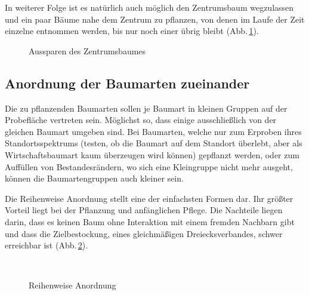 \documentclass[twocolumn]{scrartcl}
\newcommand{\hexA}[3]{%
  \begin{scope}[blend mode=difference]
    \node[hexa,fill=#3] (p) at (#1,#2) {};
    \fill[white] (p) circle (1pt);
  \end{scope}
}
\begin{document}
In weiterer Folge ist es natürlich auch möglich den Zentrumsbaum wegzulassen und
ein paar Bäume nahe dem Zentrum zu pflanzen, von denen im Laufe der Zeit
einzelne entnommen werden, bis nur noch einer übrig bleibt
(Abb.\,\ref{fig:keinZentrumsbaum}).

\begin{figure}[htbp]
  \centering
{}
\caption{Aussparen des Zentrumsbaumes}
\label{fig:keinZentrumsbaum}
\end{figure}

\subsection{Anordnung der Baumarten zueinander}

Die zu pflanzenden Baumarten sollen je Baumart in kleinen Gruppen auf der
Probefläche vertreten sein. Möglichst so, dass einige ausschließlich von der
gleichen Baumart umgeben sind. Bei Baumarten, welche nur zum Erproben ihres
Standortsspektrums (testen, ob die Baumart auf dem Standort überlebt, aber als
Wirtschaftsbaumart kaum überzeugen wird können) gepflanzt werden, oder zum
Auffüllen von Bestandesrändern, wo sich eine Kleingruppe nicht mehr ausgeht,
können die Baumartengruppen auch kleiner sein.

Die Reihenweise Anordnung stellt eine der einfachsten Formen dar. Ihr größter
Vorteil liegt bei der Pflanzung und anfänglichen Pflege. Die Nachteile liegen
darin, dass es keinen Baum ohne Interaktion mit einem fremden Nachbarn gibt und
dass die Zielbestockung, eines gleichmäßigen Dreiecksverbandes, schwer
erreichbar ist (Abb.\,\ref{fig:reihen}).

\begin{figure}[htbp]
  \centering
  \\
  \caption{Reihenweise Anordnung}
  \label{fig:reihen}
\end{figure}
\end{document}
